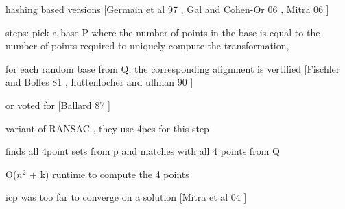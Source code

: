 hashing based versions [Germain et al 97 \cite{Germain97Fingerprint}, Gal and Cohen-Or 06 \cite{Gal06Salient}, Mitra 06 \cite{Mitra04Registration}]

steps: pick a base P where the number of points in the base is equal to the number of points required to uniquely compute the transformation,

for each random base from Q, the corresponding alignment is vertified [Fischler and Bolles 81 \cite{Fischler81Random}, huttenlocher and ullman 90 \cite{Huttenlocher91Fast} ]

or voted for [Ballard 87 \cite{Ballard91Generalizing}]

variant of RANSAC , they use 4pcs for this step

finds all 4point sets from p and matches with all 4 points from Q

O($n^2$ + k) runtime to compute the 4 points


icp was too far to converge on a solution [Mitra et al 04 \cite{Mitra04Registration}]





